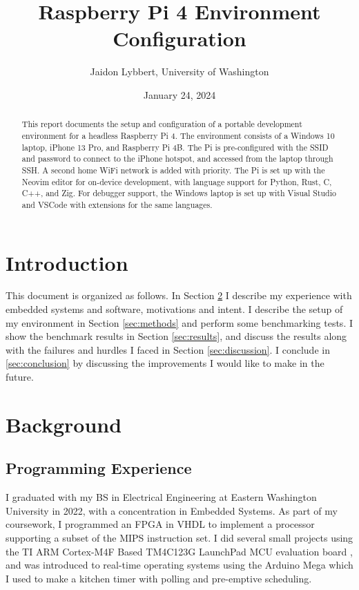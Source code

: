 \documentclass[12pt]{article}
\begin{document}
\title{Raspberry Pi 4 Environment Configuration}
\author{Jaidon Lybbert, University of Washington}
\date{January 24, 2024}

\maketitle

\begin{abstract}
This report documents the setup and configuration of a portable development environment for a headless Raspberry Pi 4. The environment consists of a Windows 10 laptop, iPhone 13 Pro, and Raspberry Pi 4B. The Pi is pre-configured with the SSID and password to connect to the iPhone hotspot, and accessed from the laptop through SSH. A second home WiFi network is added with priority. The Pi is set up with the Neovim editor for on-device development, with language support for Python, Rust, C, C++, and Zig. For debugger support, the Windows laptop is set up with Visual Studio and VSCode with extensions for the same languages.
\end{abstract}

\section{Introduction}
This document is organized as follows. In Section \ref{sec:background} I describe my experience with embedded systems and software, motivations and intent. I describe the setup of my environment in Section \ref{sec:methods} and perform some benchmarking tests. I show the benchmark results in Section \ref{sec:results}, and discuss the results along with the failures and hurdles I faced in Section \ref{sec:discussion}. I conclude in \ref{sec:conclusion} by discussing the improvements I would like to make in the future.

\section{Background}\label{sec:background}
\subsection{Programming Experience}
I graduated with my BS in Electrical Engineering at Eastern Washington University in 2022, with a concentration in Embedded Systems. As part of my coursework, I programmed an FPGA in VHDL to implement a processor supporting a subset of the MIPS instruction set. I did several small projects using the TI ARM\textregistered{} Cortex\textregistered-M4F Based TM4C123G LaunchPad\texttrademark{} MCU evaluation board \cite{ti_ek_tm4c123gxl}, and was introduced to real-time operating systems using the Arduino Mega which I used to make a kitchen timer\cite{lybbert2023} with polling and pre-emptive scheduling.
\end{document}
